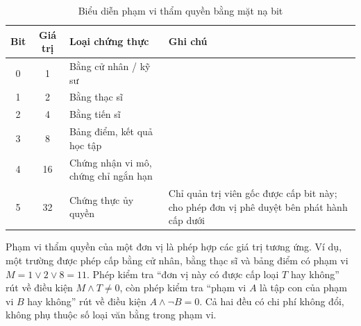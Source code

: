 \begin{table}[H]
\centering
\caption{Biểu diễn phạm vi thẩm quyền bằng mặt nạ bit}
\label{tab:vc-type-mask}
\renewcommand{\arraystretch}{1.25}
\begin{tabular}{|c|c|p{4.6cm}|p{5.2cm}|}
\hline
\textbf{Bit} & \textbf{Giá trị} & \textbf{Loại chứng thực} & \textbf{Ghi chú} \\
\hline
0 & 1  & Bằng cử nhân / kỹ sư & \\ \hline
1 & 2  & Bằng thạc sĩ & \\ \hline
2 & 4  & Bằng tiến sĩ & \\ \hline
3 & 8  & Bảng điểm, kết quả học tập & \\ \hline
4 & 16 & Chứng nhận vi mô, chứng chỉ ngắn hạn & \\ \hline
5 & 32 & Chứng thực ủy quyền & Chỉ quản trị viên gốc được cấp bit này; cho phép đơn vị phê duyệt bên phát hành cấp dưới \\ \hline
\end{tabular}
\end{table}

\noindent Phạm vi thẩm quyền của một đơn vị là phép hợp các giá trị tương ứng. Ví dụ, một trường được phép cấp bằng cử nhân, bằng thạc sĩ và bảng điểm có phạm vi $M = 1 \vee 2 \vee 8 = 11$. Phép kiểm tra {``}đơn vị này có được cấp loại $T$ hay không{''} rút về điều kiện $M \wedge T \neq 0$, còn phép kiểm tra {``}phạm vi $A$ là tập con của phạm vi $B$ hay không{''} rút về điều kiện $A \wedge \neg B = 0$. Cả hai đều có chi phí không đổi, không phụ thuộc số loại văn bằng trong phạm vi.
